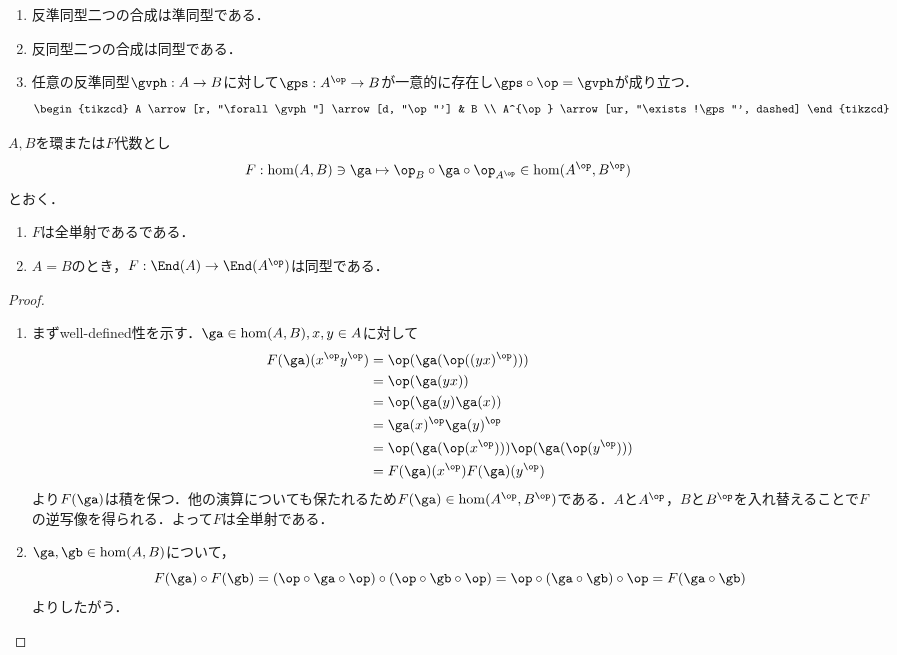 \documentclass[a4paper,11pt]{jsarticle}
\begin{document}
\begin{prop}[反転代数の普遍性]
  \begin{enumerate}
    \item 反準同型二つの合成は準同型である．
    \item 反同型二つの合成は同型である．
    \item 任意の反準同型$\gvph:A\to B$に対して$\gps:A^{\op}\to B$が一意的に存在し$\gps\circ\op=\gvph$が成り立つ．
          \[
            \begin{tikzcd}
              A \arrow[r, "\forall\gvph"] \arrow[d, "\op"'] & B \\
              A^{\op} \arrow[ur, "\exists!\gps"', dashed]
            \end{tikzcd}
          \]
  \end{enumerate}
\end{prop}\begin{prop}[自己準同型の反転]\label{prop:op_induces_hom}
  $A,B$を環または$F$代数とし
  \[
    F:\hom(A,B)\ni \ga\mapsto \op_{B} \circ \ga \circ \op_{A^{\op}} \in \hom(A^{\op},B^{\op})
  \]
  とおく．
  \begin{enumerate}
    \item $F$は全単射であるである．
    \item $A=B$のとき，$F:\End(A)\to\End(A^{\op})$は同型である．
  \end{enumerate}
\end{prop}
\begin{proof}
  \begin{enumerate}
    \item まずwell-defined性を示す．$\ga\in\hom(A,B),x,y\in A$に対して
          \begin{align*}
            F(\ga)(x^{\op}y^{\op}) & =\op(\ga(\op((yx)^{\op})))                    \\
                                   & =\op(\ga(yx))                                 \\
                                   & =\op(\ga(y)\ga(x))                            \\
                                   & =\ga(x)^{\op}\ga(y)^{\op}                     \\
                                   & =\op(\ga(\op(x^{\op})))\op(\ga(\op(y^{\op}))) \\
                                   & =F(\ga)(x^{\op})F(\ga)(y^{\op})
          \end{align*}
          より$F(\ga)$は積を保つ．他の演算についても保たれるため$F(\ga)\in\hom(A^{\op},B^{\op})$である．$A$と$A^{\op}$，$B$と$B^{\op}$を入れ替えることで$F$の逆写像を得られる．よって$F$は全単射である．
    \item $\ga,\gb\in\hom(A,B)$について，
          \[
            F(\ga)\circ F(\gb)=(\op\circ\ga\circ\op)\circ(\op\circ\gb\circ\op)
            =\op\circ(\ga\circ\gb)\circ\op
            =F(\ga\circ\gb)
          \]
          よりしたがう．
  \end{enumerate}
\end{proof}
\end{document}
